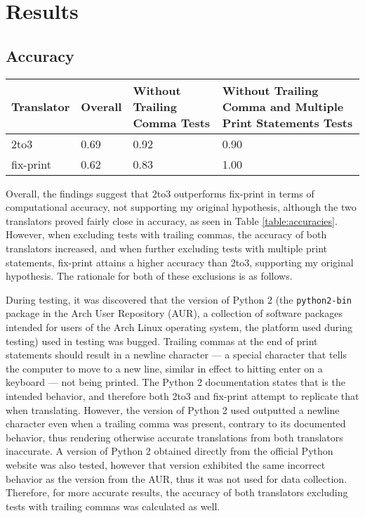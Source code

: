 \section{Results}

\subsection{Accuracy}
\begin{table*}[hbt!]
    \centering
    \begin{tabular}{@{}l|lll@{}}
    \toprule
    Translator & Overall & Without Trailing Comma Tests & Without Trailing Comma and Multiple Print Statements Tests \\ \midrule
    2to3       & 0.69                         & 0.92                                      & 0.90                                                                             \\
    fix-print & 0.62                          & 0.83                                      & 1.00                                                                               \\ \bottomrule
    \end{tabular}
    \caption{Computational accuracy of 2to3 and fix-print.}
    \label{table:accuracies}
\end{table*}

Overall, the findings suggest that 2to3 outperforms fix-print in terms of computational accuracy, not supporting my original hypothesis, although the two translators proved fairly close in accuracy, as seen in Table \ref{table:accuracies}. However, when excluding tests with trailing commas, the accuracy of both translators increased, and when further excluding tests with multiple print statements, fix-print attains a higher accuracy than 2to3, supporting my original hypothesis. The rationale for both of these exclusions is as follows.

During testing, it was discovered that the version of Python 2 (the \verb|python2-bin| package in the Arch User Repository (AUR), a collection of software packages intended for users of the Arch Linux operating system, the platform used during testing) used in testing was bugged. Trailing commas at the end of print statements should result in a newline character --- a special character that tells the computer to move to a new line, similar in effect to hitting enter on a keyboard --- not being printed. The Python 2 documentation states that is the intended behavior, and therefore both 2to3 and fix-print attempt to replicate that when translating. However, the version of Python 2 used outputted a newline character even when a trailing comma was present, contrary to its documented behavior, thus rendering otherwise accurate translations from both translators inaccurate. A version of Python 2 obtained directly from the official Python website was also tested, however that version exhibited the same incorrect behavior as the version from the AUR, thus it was not used for data collection. Therefore, for more accurate results, the accuracy of both translators excluding tests with trailing commas was calculated as well.

